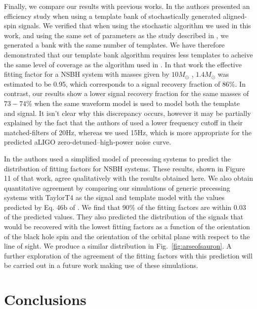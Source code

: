 Finally, we compare our results with previous works. In \cite{Ajith:2012mn}
the authors presented an efficiency study when using a template bank of 
stochastically generated aligned-spin signals. We verified that when using the 
stochastic algorithm we used in this work, and using the same set of parameters 
as the study described in \cite{Ajith:2012mn}, we generated a bank with the 
same number of templates. We have therefore demonstrated that our template bank 
algorithm requires less templates to acheive the same level of coverage as the 
algorithm used in \cite{Ajith:2012mn}. In that work the effective fitting 
factor for a \ac{NSBH} system with masses given by $10 M_{\odot}$ ,
$1.4 M_{\odot}$ was estimated to be 0.95, which corresponds to a
signal recovery fraction of 86\%.
In contrast, our results show a lower signal recovery fraction 
for the same masses of $73 - 74\%$ when the same waveform model is used to 
model both the template and signal. It isn't clear why this discrepancy 
occurs, however it may be partially explained by the fact that 
the authors of \cite{Ajith:2012mn} used a lower frequency cutoff in their 
matched-filters of 20Hz, whereas we used 15Hz, which is more appropriate for the 
predicted \ac{aLIGO} zero-detuned--high-power noise curve. 

In \cite{Brown:2012gs} the authors used a simplified model of precessing systems
to predict the distribution of fitting
factors for \ac{NSBH} systems. These results, shown in Figure 11 of that work,
agree qualitatively with the results obtained here.
We also obtain quantitative agreement by comparing our simulations of 
generic precessing systems with TaylorT4 as the signal and template model with 
the values predicted by Eq. 46b of \cite{Brown:2012gs}. We find that 90\% of 
the fitting factors are within $0.03$ of the predicted values.
They also predicted the 
distribution of the signals that would be recovered with the lowest fitting 
factors as a function of the orientation of the black hole spin and the 
orientation of the orbital plane with respect to the line of sight. We produce 
a similar distribution in Fig.~\ref{fig:arseofsauron}. 
A further exploration of the agreement of the fitting factors with 
this prediction will be carried out in a future work making use of these 
simulations.

\section{Conclusions}
\label{sec:conclusion}

